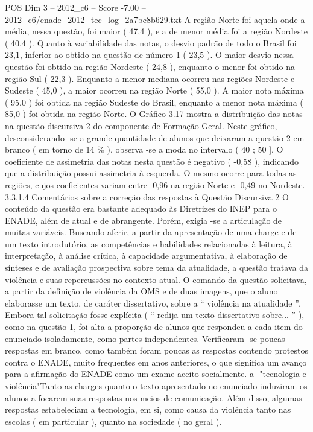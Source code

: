 \begin{textsample}{POS Dim 3 – 2012\_c6 – Score -7.00 – 2012\_c6/enade\_2012\_tec\_log\_2a7bc8b629.txt}
A região Norte foi aquela onde a média, nessa questão, foi maior ( 47,4 ), e a de menor média foi a região Nordeste ( 40,4 ).
Quanto à variabilidade das notas, o desvio padrão de todo o Brasil foi 23,1, inferior ao obtido na questão de número 1 ( 23,5 ).
O maior desvio nessa questão foi obtido na região Nordeste ( 24,8 ), enquanto o menor foi obtido na região Sul ( 22,3 ).
Enquanto a menor mediana ocorreu nas regiões Nordeste e Sudeste ( 45,0 ), a maior ocorreu na região Norte ( 55,0 ).
A maior nota máxima ( 95,0 ) foi obtida na região Sudeste do Brasil, enquanto a menor nota máxima ( 85,0 ) foi obtida na região Norte.
O Gráfico 3.17 mostra a distribuição das notas na questão discursiva 2 do componente de Formação Geral.
Neste gráfico, desconsiderando -se a grande quantidade de alunos que deixaram a questão 2 em branco ( em torno de 14 \% ), observa -se a moda no intervalo ( 40 ; 50 ].
O coeficiente de assimetria das notas nesta questão é negativo ( -0,58 ), indicando que a distribuição possui assimetria à esquerda.
O mesmo ocorre para todas as regiões, cujos coeficientes variam entre -0,96 na região Norte e -0,49 no Nordeste. 3.3.1.4 Comentários sobre a correção das respostas à Questão Discursiva 2 O conteúdo da questão era bastante adequado às Diretrizes do INEP para o ENADE, além de atual e de abrangente.
Porém, exigia -se a articulação de muitas variáveis.
Buscando aferir, a partir da apresentação de uma charge e de um texto introdutório, as competências e habilidades relacionadas à leitura, à interpretação, à análise crítica, à capacidade argumentativa, à elaboração de sínteses e de avaliação prospectiva sobre tema da atualidade, a questão tratava da violência e suas repercussões no contexto atual.
O comando da questão solicitava, a partir da definição de violência da OMS e de duas imagens, que o aluno elaborasse um texto, de caráter dissertativo, sobre a “ violência na atualidade ”.
Embora tal solicitação fosse explícita ( “ redija um texto dissertativo sobre... ” ), como na questão 1, foi alta a proporção de alunos que respondeu a cada item do enunciado isoladamente, como partes independentes.
Verificaram -se poucas respostas em branco, como também foram poucas as respostas contendo protestos contra o ENADE, muito frequentes em anos anteriores, o que significa um avanço para a afirmação do ENADE como um exame aceito socialmente. a -"tecnologia e violência"Tanto as charges quanto o texto apresentado no enunciado induziram os alunos a focarem suas respostas nos meios de comunicação.
Além disso, algumas respostas estabeleciam a tecnologia, em si, como causa da violência tanto nas escolas ( em particular ), quanto na sociedade ( no geral ).

\end{textsample}
